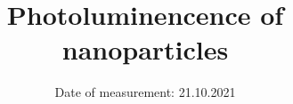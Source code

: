 

\subject{\vspace{-4cm}Labreport 1}  %
\title{\vspace{-0.5cm}Photoluminencence of nanoparticles} %
\date{\vspace{-0.5cm}
 Date of measurement: 21.10.2021  %
}




\twocolumn[
\maketitle
\begin{onecolabstract}
  
\end{onecolabstract}
]






\printbibliography{}


